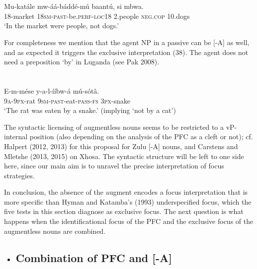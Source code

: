 \documentclass[output=paper]{langsci/langscibook}
\begin{document}
\chapter[  ]{  }
\gll   Mu-katále  mw-áá-báddé-mú    baantú,    si    mbwa.\\
       18-market  \textsc{18sm}{}-\textsc{past}{}-be.\textsc{perf}{}-\textsc{loc18}  2.people  \textsc{neg}.\textsc{cop}  10.dogs\\
\glt   ‘In the market were people, not dogs.’
\z

For completeness we mention that the agent NP in a passive can be [-A] as well, and as expected it triggers the exclusive interpretation (38). The agent does not need a preposition ‘by’ in Luganda (see Pak 2008).

\chapter[]{\itshape }
\gll   E-m-mése  y-a-l-ííbw-á      mú-sótâ.\\
       \textsc{9a}{}-\textsc{9px}{}-rat  \textsc{9sm}{}-\textsc{past}{}-eat-\textsc{pass}{}-\textsc{fs}  \textsc{3px}{}-snake\\
\glt   ‘The rat was eaten by a snake.’ (implying ‘not by a cat’)
\z

The syntactic licensing of augmentless nouns seems to be restricted to a vP-internal position (also depending on the analysis of the PFC as a cleft or not); cf. Halpert (2012, 2013) for this proposal for Zulu [-A] nouns, and Carstens and Mletshe (2013, 2015) on Xhosa. The syntactic structure will be left to one side here, since our main aim is to unravel the precise interpretation of focus strategies.

  In conclusion, the absence of the augment encodes a focus interpretation that is more specific than Hyman and Katamba’s (1993) underspecified focus, which the five tests in this section diagnose as exclusive focus. The next question is what happens when the identificational focus of the PFC and the exclusive focus of the augmentless nouns are combined.

\begin{itemize}
\item \section{ \label{bkm:Ref288132664}Combination of PFC and [-A]}
\end{itemize}
\end{document}
